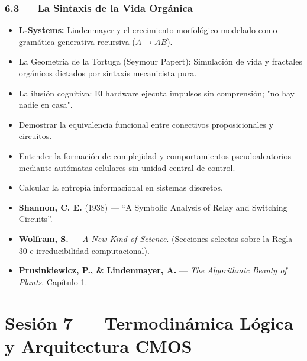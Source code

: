 \documentclass[11pt, letterpaper]{article}
\begin{document}
\subsubsection{6.3 --- La Sintaxis de la Vida Org\'anica}
\begin{itemize}
  \item \textbf{L-Systems:} Lindenmayer y el crecimiento morfol\'ogico modelado como gram\'atica generativa recursiva ($A \to AB$).
  \item La Geometr\'ia de la Tortuga (Seymour Papert): Simulaci\'on de vida y fractales org\'anicos dictados por sintaxis mecanicista pura.
  \item La ilusi\'on cognitiva: El hardware ejecuta impulsos sin comprensi\'on; "no hay nadie en casa".
\end{itemize}

\begin{objetivos}
\begin{itemize}
  \item Demostrar la equivalencia funcional entre conectivos proposicionales y circuitos.
  \item Entender la formaci\'on de complejidad y comportamientos pseudoaleatorios mediante autómatas celulares sin unidad central de control.
  \item Calcular la entrop\'ia informacional en sistemas discretos.
\end{itemize}
\end{objetivos}

\begin{lecturas}
\begin{itemize}
  \item[$(\star)$] \textbf{Shannon, C. E.} (1938) --- ``A Symbolic Analysis of Relay and Switching Circuits''.
  \item[$(\star)$] \textbf{Wolfram, S.} --- \emph{A New Kind of Science}. (Secciones selectas sobre la Regla 30 e irreducibilidad computacional).
  \item \textbf{Prusinkiewicz, P., \& Lindenmayer, A.} --- \emph{The Algorithmic Beauty of Plants}. Cap\'itulo 1.
\end{itemize}
\end{lecturas}

\newpage

\section{Sesi\'on 7 --- Termodin\'amica L\'ogica y Arquitectura CMOS}
\end{document}
